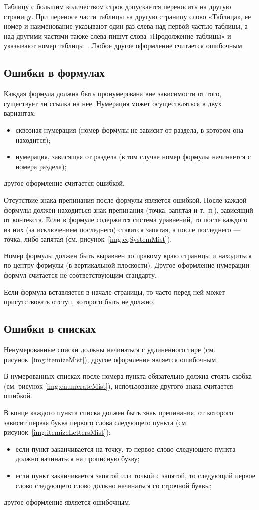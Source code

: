 \begin{appendices}
	Таблицу с большим количеством строк допускается переносить на другую страницу. При переносе части таблицы на другую страницу слово «Таблица», ее номер и наименование указывают один раз слева над первой частью таблицы, а над другими частями также слева пишут слова «Продолжение таблицы» и указывают номер таблицы~\cite{GOST732}. Любое другое оформление считается ошибочным.
	
	\subsection{Ошибки в формулах}
	Каждая формула должна быть пронумерована вне зависимости от того, существует ли ссылка на нее. Нумерация может осуществляться в двух вариантах:
	\begin{itemize}
		\item сквозная нумерация (номер формулы не зависит от раздела, в котором она находится);
		\item нумерация, зависящая от раздела (в том случае номер формулы начинается с номера раздела);
	\end{itemize}
	другое оформление считается ошибкой.
	
	Отсутствие знака препинания после формулы является ошибкой. После каждой формулы должен находиться знак препинания (точка, запятая и т.~п.), зависящий от контекста. Если в формуле содержится система уравнений, то после каждого из них (за исключением последнего) ставится запятая, а после последнего --- точка, либо запятая (см. рисунок~\ref{img:eqSystemMist}).
	
	Номер формулы должен быть выравнен по правому краю страницы и находиться по центру формулы (в вертикальной плоскости). Другое оформление нумерации формул считается не соответствующим стандарту.
	
	Если формула вставляется в начале страницы, то часто перед ней может присутствовать отступ, которого быть не должно.
	
	\subsection{Ошибки в списках}
	Ненумерованные списки должны начинаться с удлиненного тире (см. рисунок~\ref{img:itemizeMist}), другое оформление является ошибочным.
	
	В нумерованных списках после номера пункта обязательно должна стоять скобка (см. рисунок \ref{img:enumerateMist}), использование другого знака считается ошибкой.
	
	В конце каждого пункта списка должен быть знак препинания, от которого зависит первая буква первого слова следующего пункта (см. рисунок~\ref{img:itemizeLettersMist}):
	\begin{itemize}
		\item если пункт заканчивается на точку, то первое слово следующего пункта должно начинаться на прописную букву;
		\item если пункт заканчивается запятой или точкой с запятой, то следующий первое слово следующего слово должно начинаться со строчной буквы;
	\end{itemize}
	другое оформление является ошибочным.
	

\end{appendices}
